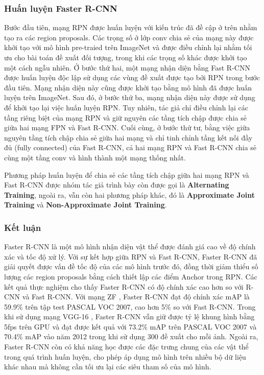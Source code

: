 \subsubsection*{Huấn luyện Faster R-CNN}
Bước đầu tiên, mạng RPN được huấn luyện với kiến trúc đã đề cập ở trên nhằm tạo ra các region proposals. Các trọng số ở lớp conv chia sẻ của mạng này được khởi tạo với mô hình pre-traied trên ImageNet và được điều chỉnh lại nhằm tối ưu cho bài toán đề xuất đối tượng, trong khi các trọng số khác được khởi tạo một cách ngẫu nhiên. Ở bước thứ hai, một mạng nhận diện bằng Fast R-CNN được huấn luyện độc lập sử dụng các vùng đề xuất được tạo bởi RPN trong bước đầu tiên. Mạng nhận diện này cũng được khởi tạo bằng mô hình đã được huấn luyện trên ImageNet. Sau đó, ở bước thứ ba, mạng nhận diện này được sử dụng để khởi tạo lại việc huấn luyện RPN. Tuy nhiên, tác giả chỉ điều chỉnh lại các tầng riêng biệt của mạng RPN và giữ nguyên các tầng tích chập được chia sẻ giữa hai mạng FPN và Fast R-CNN. Cuối cùng, ở bước thứ tư, bằng việc giữa nguyên tầng tích chập chia sẻ giữa hai mạng và chỉ tinh chỉnh tầng kết nối đầy đủ (fully connected) của Fast R-CNN, cả hai mạng RPN và Fast R-CNN chia sẻ cùng một tầng conv và hình thành một mạng thống nhất.

Phương pháp huấn luyện để chia sẻ các tầng tích chập giữa hai mạng RPN và Fast R-CNN được nhóm tác giả trình bày còn được gọi là \textbf{Alternating Training}, ngoài ra, vẫn còn hai phương pháp khác, đó là \textbf{Approximate Joint Training} và \textbf{Non-Approximate Joint Training}.

\subsubsection*{Kết luận}
Faster R-CNN là một mô hình nhận diện vật thể được đánh giá cao về độ chính xác và tốc độ xử lý. Với sự kết hợp giữa RPN và Fast R-CNN, Faster R-CNN đã giải quyết được vấn đề tốc độ của các mô hình trước đó, đồng thời giảm thiểu số lượng các region proposals bằng cách thiết lập các điểm Anchor trong RPN.  Các kết quả thực nghiệm cho thấy Faster R-CNN có độ chính xác cao hơn so với R-CNN và Fast R-CNN. Với mạng ZF \cite{matthew2014visualizing}, Faster R-CNN đạt độ chính xác mAP là 59.9\% trên tập test PASCAL VOC 2007, cao hơn 5\% so với Fast R-CNN. Trong khi sử dụng mạng VGG-16 \citep{simonyan2014very}, Faster R-CNN vẫn giữ được tỷ lệ khung hình bằng 5fps trên GPU và đạt được kết quả với 73.2\% mAP trên PASCAL VOC 2007 và 70.4\% mAP vào năm 2012 trong khi sử dụng 300 đề xuất cho mỗi ảnh. Ngoài ra, Faster R-CNN còn có khả năng học được các đặc trưng chung của các vật thể trong quá trình huấn luyện, cho phép áp dụng mô hình trên nhiều bộ dữ liệu khác nhau mà không cần tối ưu lại các siêu tham số của mô hình.


